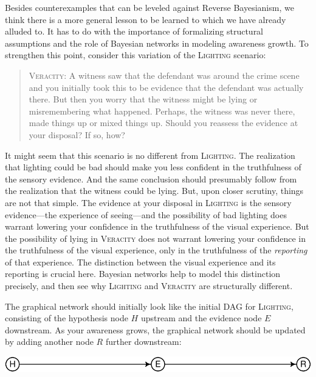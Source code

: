\documentclass[
  11pt,
  dvipsnames,enabledeprecatedfontcommands]{scrartcl}
\begin{document}
Besides counterexamples that can be leveled against Reverse Bayesianism,
we think there is a more general lesson to be learned to which we have
already alluded to. It has to do with the importance of formalizing
structural assumptions and the role of Bayesian networks in modeling
awareness growth. To strengthen this point, consider this variation of
the \textsc{Lighting} scenario:

\begin{quote}
\textsc{Veracity}: A witness saw that the defendant was around the crime
scene and you initially took this to be evidence that the defendant was
actually there. But then you worry that the witness might be lying or
misremembering what happened. Perhaps, the witness was never there, made
things up or mixed things up. Should you reassess the evidence at your
disposal? If so, how?
\end{quote}

\doublespace

\noindent   It might seem that this scenario is no different from
\textsc{Lighting}. The realization that lighting could be bad should
make you less confident in the truthfulness of the sensory evidence. And
the same conclusion should presumably follow from the realization that
the witness could be lying. But, upon closer scrutiny, things are not
that simple. The evidence at your disposal in \textsc{Lighting} is the
sensory evidence---the experience of seeing---and the possibility of bad
lighting does warrant lowering your confidence in the truthfulness of
the visual experience. But the possibility of lying in \textsc{Veracity}
does not warrant lowering your confidence in the truthfulness of the
visual experience, only in the truthfulness of the \textit{reporting} of
that experience. The distinction between the visual experience and its
reporting is crucial here. Bayesian networks help to model this
distinction precisely, and then see why \textsc{Lighting} and
\textsc{Veracity} are structurally different.

The graphical network should initially look like the initial DAG for
\textsc{Lighting}, consisting of the hypothesis node \(H\) upstream and
the evidence node \(E\) downstream. As your awareness grows, the
graphical network should be updated by adding another node \(R\) further
downstream:

\begin{center}\includegraphics[width=0.5\linewidth,height=0.3\textheight]{ReplyToSteeleStefansson5_files/figure-latex/veracityDAG-1} \end{center}
\end{document}
